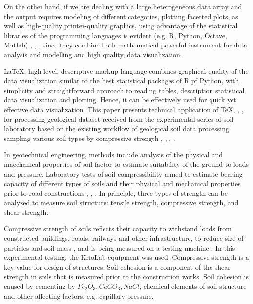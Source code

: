 \documentclass[a4paper,10pt]{article}
\begin{document}
On the other hand, if we are dealing with a large heterogeneous data array and the output requires modeling of different categories, plotting facetted plots, as well as high-quality printer-quality graphics, using advantage of the statistical libraries of the programming languages is evident (e.g. R, Python, Octave, Matlab) \cite{Lemenkova201871}, \cite{Lemenkova2019104}, \cite{Lemenkova2019100}, since they combine both mathematical powerful instrument for data analysis and  modelling and high quality, data visualization. 

\LaTeX, high-level, descriptive markup language combines graphical quality of the data visualization similar to the best statistical packages of R pf Python, with simplicity and straightforward approach to reading tables, description statistical data visualization and plotting. Hence, it can be effectively used for quick yet effective data visualization. This paper presents technical application of \TeX \space \cite{Knuth1990}, \cite{Knuth1986}, \cite{Knuth1984}, \cite{Knuth1968} for processing geological dataset received from the experimental series of soil laboratory based on the existing workflow of geological soil data processing sampling various soil types by compressive strength \cite{Lemenkov2018b}, \cite{Dahlinetal1999}, \cite{Lemenkov2018c}, \cite{Lindh2004}.

In geotechnical engineering, methods include analysis of the physical and maechanical properties of soil factor to estimate suitability of the ground to loads and pressure. Laboratory tests of soil compressibility aimed to estimate bearing capacity of different types of soils and their physical and mechanical properties prior to road constructions \cite{Boldyrevetal2006}, \cite{Lemenkov2018f}, \cite{RidleyBurland}. In principle, three types of strength can be analyzed to measure soil structure: tensile strength, compressive strength, and shear strength. 

Compressive strength of soils reflects their capacity to withstand loads from constructed buildings, roads, railways and other infrastructure, to reduce size of particles and soil mass \cite{Ganetal1988}, and is being measured on a testing machine \cite{Lemenkov2018a}. In this experimental testing, the KrioLab equipment was used. Compressive strength is a key value for design of structures. Soil cohesion is a component of the shear strength in soils that is measured prior to the construction works. Soil cohesion is caused by cementing by $Fe_{2}O_{3}, CaCO_{3}, NaCl$, chemical elements of soil structure \cite{Lemenkov2018g} and other affecting factors, e.g. capillary pressure. 
\end{document}

